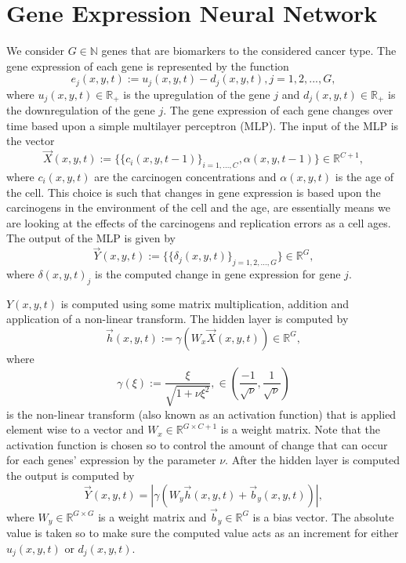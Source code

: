 \documentclass[\main/thesis.tex]{subfiles}
\begin{document}
\section{Gene Expression Neural Network}

We consider $G {\in} \mathbb{N}$ genes that are biomarkers to the considered 
cancer type. The gene expression of each gene is represented by the function
$$
e_j(x, y, t) {:=} u_j(x, y, t) {-} d_j(x, y, t), j {=} 1, 2, ..., G,
$$
where $u_j(x, y, t) {\in} \mathbb{R}_+$ is the upregulation of the gene $j$ and
$d_j(x, y, t) {\in} \mathbb{R}_+$ is the downregulation of the gene $j$. The 
gene expression of each gene changes over time based upon a simple multilayer 
perceptron (MLP). The input of the MLP is the vector
$$
\vec{X}(x, y, t) {:=} 
  \{
    \{ c_i(x, y, t {-} 1) \}_{i {=} 1,...,C},
    \alpha(x, y, t {-} 1)
  \} 
{\in} \mathbb{R}^{C {+} 1},
$$
where $c_i(x, y, t)$ are the carcinogen concentrations and $\alpha(x, y, t)$ is 
the age of the cell. This choice is such that changes in gene expression is based 
upon the carcinogens in the environment of the cell and the age, are 
essentially means we are looking at the effects of the carcinogens
and replication errors as a cell ages. The output of the MLP is given by
$$
\vec{Y}(x, y, t) {:=} \{ \{ \delta_j(x, y, t) \}_{j {=} 1, 2, ..., G} \}
{\in} \mathbb{R}^{G},
$$
where $\delta(x, y, t)_j$ is the computed change in gene expression for gene 
$j$. 

$Y(x, y, t)$ is computed using some matrix multiplication, addition and 
application of a non-linear transform. The hidden layer is computed by
$$
\vec{h}(x, y, t) {:=} \gamma(W_x \vec{X}(x, y, t))
{\in} \mathbb{R}^{G},
$$
where
$$
\gamma(\xi) {:=} \frac{\xi}
                      {\sqrt{1 {+} \nu \xi^2}},
{\in} \left(
        \frac{\minus 1}
             {\sqrt{\nu}},
        \frac{1}
             {\sqrt{\nu}}
      \right) 
$$
is the non-linear transform (also known as an activation function) that is 
applied element wise to a vector and $W_x {\in} \mathbb{R}^{G {\times} C {+} 1}$ 
is a weight matrix. Note that the activation function is chosen so to 
control the amount of change that can occur for each genes' expression by 
the parameter $\nu$. After the hidden layer is computed the output is 
computed by
$$
\vec{Y}(x, y, t) {=} \left| \gamma(W_y \vec{h}(x, y, t) {+} \vec{b}_y(x, y, t)) \right|, 
$$
where $W_y {\in} \mathbb{R}^{G {\times} G}$ is a weight matrix and
$\vec{b}_y {\in} \mathbb{R}^G$ is a bias vector. The absolute value is taken so 
to make sure the computed value acts as an increment for either $u_j(x, y, t)$ 
or $d_j(x, y, t)$. 
\end{document}
